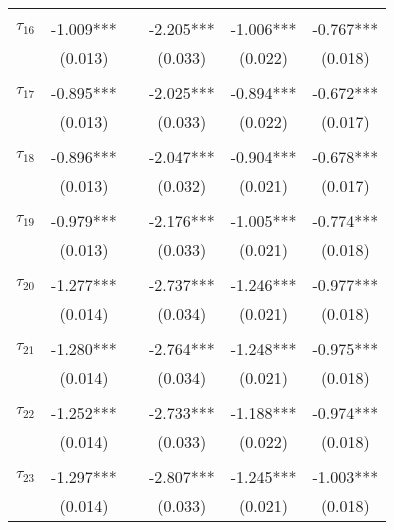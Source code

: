 \begin{tabular}{@{\extracolsep{-0pt}}lccccc}
                &           &&           &           &           \\[-2.1ex]
$\tau_{16}$     & -1.009*** && -2.205*** & -1.006*** & -0.767*** \\
                &  (0.013)  &&  (0.033)  &  (0.022)  &  (0.018)  \\
                &           &&           &           &           \\[-2.1ex]
$\tau_{17}$     & -0.895*** && -2.025*** & -0.894*** & -0.672*** \\
                &  (0.013)  &&  (0.033)  &  (0.022)  &  (0.017)  \\
                &           &&           &           &           \\[-2.1ex]
$\tau_{18}$     & -0.896*** && -2.047*** & -0.904*** & -0.678*** \\
                &  (0.013)  &&  (0.032)  &  (0.021)  &  (0.017)  \\
                &           &&           &           &           \\[-2.1ex]
$\tau_{19}$     & -0.979*** && -2.176*** & -1.005*** & -0.774*** \\
                &  (0.013)  &&  (0.033)  &  (0.021)  &  (0.018)  \\
                &           &&           &           &           \\[-2.1ex]
$\tau_{20}$     & -1.277*** && -2.737*** & -1.246*** & -0.977*** \\
                &  (0.014)  &&  (0.034)  &  (0.021)  &  (0.018)  \\
                &           &&           &           &           \\[-2.1ex]
$\tau_{21}$     & -1.280*** && -2.764*** & -1.248*** & -0.975*** \\
                &  (0.014)  &&  (0.034)  &  (0.021)  &  (0.018)  \\
                &           &&           &           &           \\[-2.1ex]
$\tau_{22}$     & -1.252*** && -2.733*** & -1.188*** & -0.974*** \\
                &  (0.014)  &&  (0.033)  &  (0.022)  &  (0.018)  \\
                &           &&           &           &           \\[-2.1ex]
$\tau_{23}$     & -1.297*** && -2.807*** & -1.245*** & -1.003*** \\
                &  (0.014)  &&  (0.033)  &  (0.021)  &  (0.018)  \\

\end{tabular}
